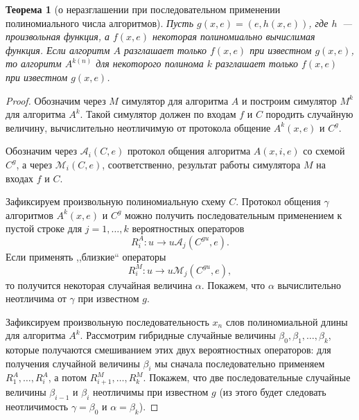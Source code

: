 \documentclass[12pt,a4paper]{article}
\theoremstyle{definition}
\theoremstyle{plain}
\newtheorem{theorem}{Теорема}[section]
\theoremstyle{remark}
\begin{document}
\begin{theorem}[о неразглашении при последовательном применении полиномиального числа алгоритмов]
\label{thm:knowledge-poly-repetition}
Пусть $g(x,e) = (e, h(x,e))$, где $h$~--- произвольная функция, а $f(x,e)$ некоторая полиномиально
вычислимая функция. Если алгоритм $A$ разглашает только $f(x,e)$ при известном $g(x,e)$,
то алгоритм $A^{k(n)}$ для некоторого полинома $k$ разглашает только $f(x,e)$ при известном $g(x,e)$.
\end{theorem}
\begin{proof}
Обозначим через $M$ симулятор для алгоритма $A$ и построим симулятор $M^k$ для алгоритма $A^k$. Такой симулятор должен по входам $f$ и $C$ породить случайную величину, вычислительно неотличимую от протокола общение $A^k(x,e)$ и $C^g$.

Обозначим через $\mathcal{A}_i(C,e)$ протокол общения алгоритма $A(x,i,e)$ 
со схемой $C^g$, а через $\mathcal{M}_i(C,e)$, соответственно, 
результат работы симулятора $M$ на входах $f$ и $C$.

Зафиксируем произвольную полиномиальную схему $C$. Протокол общения $\gamma$ алгоритмов
$A^k(x,e)$ и $C^g$ можно получить последовательным применением к пустой строке для 
$j=1,\dotsc,k$ вероятностных операторов 
$$
R^A_i: u\to u\mathcal A_j(C^{gu}, e).
$$
Если применять ,,близкие`` операторы
$$
R^M_i: u\to u\mathcal M_j(C^{gu}, e),
$$
то получится некоторая случайная величина $\alpha$. Покажем, что $\alpha$
вычислительно неотличима от $\gamma$ при известном $g$.

Зафиксируем произвольную последовательность $x_n$ слов 
полиномиальной длины для алгоритма $A^k$.
Рассмотрим гибридные случайные величины $\beta_0,\beta_1,\dotsc,\beta_k$, которые
получаются смешиванием этих двух вероятностных операторов: для получения случайной величины 
$\beta_i$ мы сначала последовательно применяем $R^A_1, \dotsc, R^A_i$, а потом 
$R^M_{i+1}, \dotsc, R^M_k$.
Покажем, что две последовательные случайные величины $\beta_{i-1}$ и $\beta_{i}$
неотличимы при известном $g$ (из этого будет следовать неотличимость $\gamma=\beta_0$ и $\alpha=\beta_k$).


\end{proof}
\end{document}
